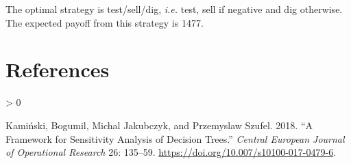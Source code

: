 \documentclass[
]{article}
\newlength{\cslhangindent}
\newenvironment{CSLReferences}[2] %
 {%
  \setlength{\parindent}{0pt}
  \ifodd #1 \everypar{\setlength{\hangindent}{\cslhangindent}}\ignorespaces\fi
  \ifnum #2 > 0
  \setlength{\parskip}{#2\baselineskip}
  \fi
 }%
 {}
\begin{document}
The optimal strategy is test/sell/dig, \emph{i.e.} test, sell if
negative and dig otherwise. The expected payoff from this strategy is
1477.

\hypertarget{references}{%
\section*{References}\label{references}}

\hypertarget{refs}{}
\begin{CSLReferences}{1}{0}
\leavevmode\hypertarget{ref-kaminski:2018a}{}%
Kamiński, Bogumil, Michal Jakubczyk, and Przemyslaw Szufel. 2018. {``A
Framework for Sensitivity Analysis of Decision Trees.''} \emph{Central
European Journal of Operational Research} 26: 135--59.
\url{https://doi.org/10.007/s10100-017-0479-6}.

\end{CSLReferences}
\end{document}
